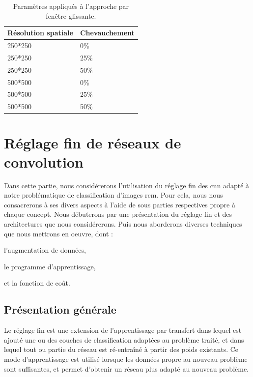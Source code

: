 \begin{table}[H]
    \centering
    \begin{tabular*}{0.6\linewidth}{l@{\extracolsep{\fill}}l}
    \toprule
    \textbf{Résolution spatiale}& \textbf{Chevauchement}   \\ \hline
    250*250                     & 0\%                      \\ \hline
    250*250                     & 25\%                     \\ \hline
    250*250                     & 50\%                     \\ \hline 
    500*500                     & 0\%                      \\ \hline
    500*500                     & 25\%                     \\ \hline
    500*500                     & 50\%                     \\
    \bottomrule
    \end{tabular*}
    \caption{Paramètres appliqués à l'approche par fenêtre glissante.}
    \label{tab:sliding_window_parameters}
\end{table}\par

\section{Réglage fin de réseaux de convolution}
Dans cette partie, nous considérerons l'utilisation du réglage fin des \gls{cnn} adapté à notre problématique de classification d'images \gls{rcm}. Pour cela, nous nous consacrerons à ses divers aspects à l'aide de sous parties respectives propre à chaque concept. Nous débuterons par une présentation du réglage fin et des architectures que nous considérerons. Puis nous aborderons diverses techniques que nous mettrons en oeuvre, dont :
\begin{inlinerate}
    \item l'augmentation de données,
    \item le programme d'apprentissage,
    \item et la fonction de coût.
\end{inlinerate}\par

\subsection{Présentation générale}
Le réglage fin est une extension de l'apprentissage par transfert dans lequel est ajouté une ou des couches de classification adaptées au problème traité, et dans lequel tout ou partie du réseau est ré-entraîné à partir des poids existants. Ce mode d'apprentissage est utilisé lorsque les données propre au nouveau problème sont suffisantes, et permet d'obtenir un réseau plus adapté au nouveau problème.\par

